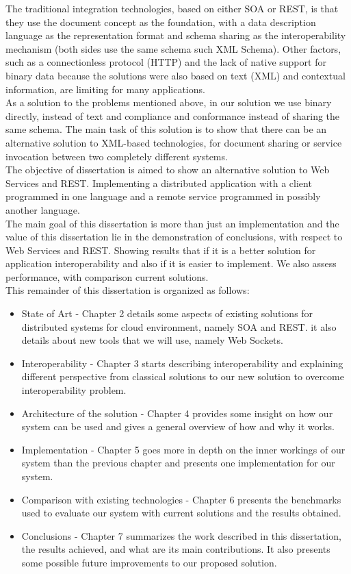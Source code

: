 The traditional integration technologies, based on either SOA or REST, is that they use the document concept as the foundation,
with a data description language as the representation format and schema sharing as the interoperability mechanism (both sides
use the same schema such XML Schema). Other factors, such as a connectionless protocol (HTTP) and the lack of native support for
binary data because the solutions were also based on text (XML) and contextual information, are limiting for many applications.\\

As a solution to the problems mentioned above, in our solution we use binary directly, instead of text and compliance and
conformance instead of sharing the same schema. The main task of this solution is to show that there can be an alternative
solution to XML-based technologies, for document sharing or service invocation between two completely different systems.\\

The objective of dissertation is aimed to show an alternative solution to Web Services and REST.
Implementing a distributed application with a client programmed in one language and a remote service programmed in possibly
another language.\\

The main goal of this dissertation is more than just an implementation and the value of this dissertation lie in the
demonstration of conclusions, with respect to Web Services and REST. Showing results that if it is a better solution for
application interoperability and also if it is easier to implement. We also assess performance, with comparison current solutions.\\

This remainder of this dissertation is organized as follows:

\begin{itemize}
\item State of Art - Chapter 2 details some aspects of existing solutions for distributed systems for cloud environment, namely SOA and REST. it also details
about new tools that we will use, namely Web Sockets.
\item Interoperability - Chapter 3 starts describing interoperability and explaining different perspective from classical
solutions to our new solution to overcome interoperability problem.
\item Architecture of the solution - Chapter 4 provides some insight on how our system can be used and gives a general overview of
how and why it works.
\item Implementation - Chapter 5 goes more in depth on the inner workings of our system than the previous chapter and presents one implementation
for our system.
\item Comparison with existing technologies - Chapter 6 presents the benchmarks used to evaluate our system with current solutions and
the results obtained.
\item Conclusions - Chapter 7 summarizes the work described in this dissertation, the results achieved, and what are its main contributions.
It also presents some possible future improvements to our proposed solution.
\end{itemize}
